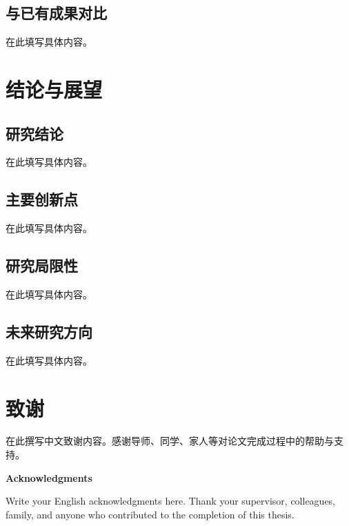 \documentclass[a4paper,12pt,openright]{ctexrep}
\begin{document}
\section{与已有成果对比}
在此填写具体内容。


\chapter{结论与展望}
\section{研究结论}
在此填写具体内容。

\section{主要创新点}
在此填写具体内容。

\section{研究局限性}
在此填写具体内容。

\section{未来研究方向}
在此填写具体内容。






\chapter*{致\quad 谢}

在此撰写中文致谢内容。感谢导师、同学、家人等对论文完成过程中的帮助与支持。

\vspace{1cm}
\begin{center}
{\large \textbf{Acknowledgments}}
\end{center}
\vspace{0.3cm}

Write your English acknowledgments here. Thank your supervisor, colleagues, family, and anyone who contributed to the completion of this thesis.
\end{document}
